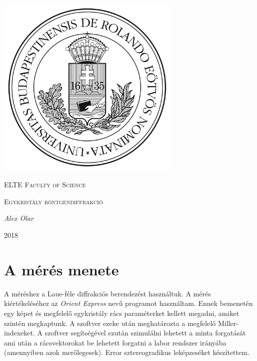 \documentclass[a4paper,12pt]{article}
\begin{document}
\linespread{1.2}

\begin{titlepage}

	\centering
	\centering
	\includegraphics[width=0.66\textwidth]{../elte.jpg}\par\vspace{1cm}
	{\scshape\LARGE ELTE Faculty of Science\par}
	\vspace{3cm}
	{\scshape\Large Egykristály röntgendiffrakció\par}
	\vspace{1cm}
	{\large\itshape Alex Olar \par}
	\vspace{3cm}
	{\large 2018 \par}

\end{titlepage}

\onehalfspacing

\begin{abstract}
	A mérés során megismerkedtünk az egykristály röntgendiffrakcióval.
	A mérés során zafír, só és szilícium egykristályokat vizsgáltunk.
\end{abstract}

\tableofcontents

\newpage

\section{A mérés menete}

\par A méréshez a Laue-féle diffrakciós berendezést használtuk. A mérés kiértékeléséhez
az \textit{Orient Express} nevű programot használtam. Ennek bemenetén egy képet és
megfelelő egykristály rács paraméterket kellett megadni, amiket szintén megkaptunk.
A szoftver ezeke után meghatározta a megfelelő Miller-indexeket. A szoftver
segítségével ezután szimulálni lehetett a minta forgatását ami után a rácsvektorokat
be lehetett forgatni a labor rendszer irányába (amennyiben azok merőlegesek).
Error sztereogradikus leképzeséket készítettem.
\end{document}
